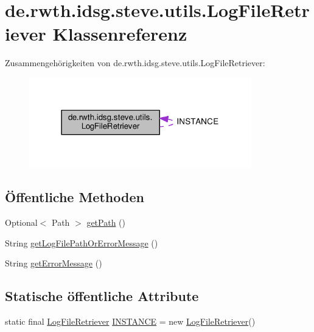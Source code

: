 \hypertarget{classde_1_1rwth_1_1idsg_1_1steve_1_1utils_1_1_log_file_retriever}{\section{de.\+rwth.\+idsg.\+steve.\+utils.\+Log\+File\+Retriever Klassenreferenz}
\label{classde_1_1rwth_1_1idsg_1_1steve_1_1utils_1_1_log_file_retriever}
}


Zusammengehörigkeiten von de.\+rwth.\+idsg.\+steve.\+utils.\+Log\+File\+Retriever\+:\nopagebreak
\begin{figure}[H]
\begin{center}
\leavevmode
\includegraphics[width=274pt]{classde_1_1rwth_1_1idsg_1_1steve_1_1utils_1_1_log_file_retriever__coll__graph}
\end{center}
\end{figure}
\subsection*{Öffentliche Methoden}
\begin{DoxyCompactItemize}
\item 
Optional$<$ Path $>$ \hyperlink{classde_1_1rwth_1_1idsg_1_1steve_1_1utils_1_1_log_file_retriever_ae8f44ca96c1e0e94bd8e2814682f904a}{get\+Path} ()
\item 
String \hyperlink{classde_1_1rwth_1_1idsg_1_1steve_1_1utils_1_1_log_file_retriever_aa094c4ee2ac80d8187447ae9a08a8c5e}{get\+Log\+File\+Path\+Or\+Error\+Message} ()
\item 
String \hyperlink{classde_1_1rwth_1_1idsg_1_1steve_1_1utils_1_1_log_file_retriever_a569c4233966078156a5608a1f6e7b882}{get\+Error\+Message} ()
\end{DoxyCompactItemize}
\subsection*{Statische öffentliche Attribute}
\begin{DoxyCompactItemize}
\item 
static final \hyperlink{classde_1_1rwth_1_1idsg_1_1steve_1_1utils_1_1_log_file_retriever}{Log\+File\+Retriever} \hyperlink{classde_1_1rwth_1_1idsg_1_1steve_1_1utils_1_1_log_file_retriever_a6c781c54739ebb14c7702dd5f753ea59}{I\+N\+S\+T\+A\+N\+C\+E} = new \hyperlink{classde_1_1rwth_1_1idsg_1_1steve_1_1utils_1_1_log_file_retriever}{Log\+File\+Retriever}()
\end{DoxyCompactItemize}



